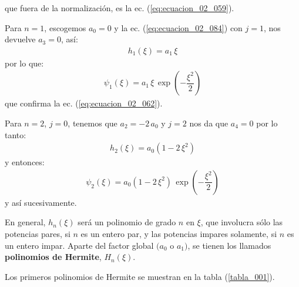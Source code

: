 que fuera de la normalización, es la ec. (\ref{eq:ecuacion_02_059}).
\par
Para $n=1$, escogemos $a_{0} = 0$ y la ec. (\ref{eq:ecuacion_02_084}) con $j = 1$, nos devuelve $a_{3} = 0$, así:
\begin{align*}
h_{1} (\xi) = a_{1} \, \xi
\end{align*}
por lo que:
\begin{align*}
\psi_{1} (\xi) = a_{1} \, \xi \, \exp \left( - \dfrac{\xi^{2}}{2} \right)
\end{align*}
que confirma la ec. (\ref{eq:ecuacion_02_062}).
\par
Para $n = 2$, $j = 0$, tenemos que $a_{2} = - 2 \, a_{0}$ y $j = 2$ nos da que $a_{4} = 0$ por lo tanto:
\begin{align*}
h_{2} (\xi) = a_{0} (1 - 2 \, \xi^{2})
\end{align*}
y entonces:
\begin{align*}
\psi_{2} (\xi) = a_{0} (1 - 2 \, \xi^{2}) \, \exp \left( - \dfrac{\xi^{2}}{2} \right)
\end{align*}
y así sucesivamente.
\par
En general, $h_{n} (\xi)$ será un polinomio de grado $n$ en $\xi$, que involucra sólo las potencias pares, si $n$ es un entero par, y las potencias impares solamente, si $n$ es un entero impar. Aparte del factor global $(a_{0}$ o $a_{1})$, se tienen los llamados \textbf{polinomios de Hermite}, $H_{n} (\xi)$.
\par
Los primeros polinomios de Hermite se muestran en la tabla (\ref{tabla_001}). 
